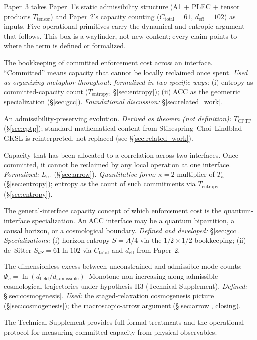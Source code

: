 \documentclass[11pt]{article}
\begin{document}
\begin{tcolorbox}[apfbox, title={Operational primitives: where each ledger term is defined and used}]
Paper~3 takes Paper~1's static admissibility structure (A1 + PLEC + tensor products $T_{\mathrm{tensor}}$) and Paper~2's capacity counting ($C_{\mathrm{total}} = 61$, $d_{\mathrm{eff}} = 102$) as inputs.  Five operational primitives carry the dynamical and entropic argument that follows.  This box is a wayfinder, not new content; every claim points to where the term is defined or formalized.

\begin{description}[topsep=2pt,itemsep=2pt]
  \item[Ledger.]  The bookkeeping of committed enforcement cost across an interface.  ``Committed'' means capacity that cannot be locally reclaimed once spent.  \emph{Used as organizing metaphor throughout;} \emph{formalized in two specific ways:} (i) entropy as committed-capacity count ($T_{\mathrm{entropy}}$, \S\ref{sec:entropy}); (ii) ACC as the geometric specialization (\S\ref{sec:gcc}).  \emph{Foundational discussion:} \S\ref{sec:related_work}.
  \item[CPTP map.]  An admissibility-preserving evolution.  \emph{Derived as theorem (not definition):} $T_{\mathrm{CPTP}}$ (\S\ref{sec:cptp}); standard mathematical content from Stinespring--Choi--Lindblad--GKSL is reinterpreted, not replaced (see \S\ref{sec:related_work}).
  \item[Committed capacity / cross-interface correlation.]  Capacity that has been allocated to a correlation across two interfaces.  Once committed, it cannot be reclaimed by any local operation at one interface.  \emph{Formalized:} $L_{\mathrm{irr}}$ (\S\ref{sec:arrow}).  \emph{Quantitative form:} $\kappa = 2$ multiplier of $T_\kappa$ (\S\ref{sec:entropy}); entropy as the count of such commitments via $T_{\mathrm{entropy}}$ (\S\ref{sec:entropy}).
  \item[Admissibility carrying capacity (ACC).]  The general-interface capacity concept of which enforcement cost is the quantum-interface specialization.  An ACC interface may be a quantum bipartition, a causal horizon, or a cosmological boundary.  \emph{Defined and developed:} \S\ref{sec:gcc}.  \emph{Specializations:} (i) horizon entropy $S = A/4$ via the $1/2 \times 1/2$ bookkeeping; (ii) de~Sitter $S_{dS} = 61\ln 102$ via $C_{\mathrm{total}}$ and $d_{\mathrm{eff}}$ from Paper~2.
  \item[Constraint functional $\Phi_c$.]  The dimensionless excess between unconstrained and admissible mode counts: $\Phi_c = \ln(d_{\mathrm{field}}/d_{\mathrm{admissible}})$.  Monotone-non-increasing along admissible cosmological trajectories under hypothesis H3 (Technical Supplement).  \emph{Defined:} \S\ref{sec:cosmogenesis}.  \emph{Used:} the staged-relaxation cosmogenesis picture (\S\ref{sec:cosmogenesis}); the macroscopic-arrow argument (\S\ref{sec:arrow}, closing).
\end{description}

\noindent The Technical Supplement provides full formal treatments and the operational protocol for measuring committed capacity from physical observables.
\end{tcolorbox}
\end{document}
